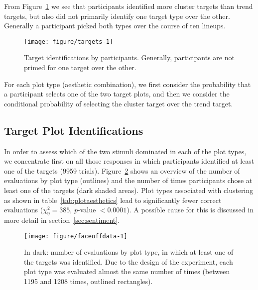 \documentclass[12pt]{article}\usepackage[]{graphicx}\usepackage[]{color}
\newenvironment{knitrout}{}{} %
\begin{document}
From Figure~\ref{fig:targets} we see that participants identified more cluster targets than trend targets, but also did not primarily identify one target type over the other. Generally a participant picked both types over the course of ten lineups.

\begin{figure}[ht]
\centering
\begin{knitrout}
\color{fgcolor}

{\centering \texttt{[image: figure/targets-1]} 

}



\end{knitrout}
\caption{\label{fig:targets}Target identifications by participants. Generally,  participants are not primed for one target over the other.}
\end{figure}

For each plot type (aesthetic combination), we first consider the probability that a participant selects one of the two target plots, and then we consider the conditional probability of selecting the cluster target  over the trend target. 


\subsection{Target Plot Identifications}

In order to assess which of the two stimuli dominated in each of the plot types, we concentrate first on all those responses in which participants identified at least one of the targets (9959 trials). 
Figure~\ref{fig:onetarget} shows an overview of the number of evaluations by plot type (outlines) and the number of times participants chose at least one of the targets (dark shaded areas). 
Plot types  associated with  clustering as shown in table~\ref{tab:plotaesthetics} lead to significantly fewer correct evaluations ($\chi^2_{9} = 385$, $p$-value $< 0.0001$). A  possible cause for this is discussed in more detail in section~\ref{sec:sentiment}. 

\begin{figure}[h!bt]\centering
\begin{knitrout}
\color{fgcolor}

{\centering \texttt{[image: figure/faceoffdata-1]} 

}



\end{knitrout}
\caption{\label{fig:onetarget} In dark: number of evaluations by plot type, in which at least one of the targets was identified. Due to the design of the experiment, each plot type was evaluated almost the same number of times (between 1195 and 1208 times, outlined rectangles).}
\end{figure}
\end{document}
